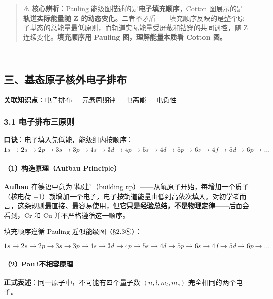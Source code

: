 \documentclass[a4paper,11pt]{ctexart}
\begin{document}
\begin{quote}
⚠️ \textbf{核心辨析}：Pauling 能级图描述的是\textbf{电子填充顺序}，Cotton 图展示的是\textbf{轨道实际能量随 Z 的动态变化}。二者不矛盾------填充顺序反映的是整个原子基态的总能量最低原则，而轨道实际能量受屏蔽和钻穿的共同调控，随 Z 连续变化。\textbf{填充顺序用 Pauling 图，理解能量本质看 Cotton 图。}
\end{quote}

------

\subsection{三、基态原子核外电子排布}\label{ux4e09ux57faux6001ux539fux5b50ux6838ux5916ux7535ux5b50ux6392ux5e03}

\textbf{关联知识点}：电子排布 · 元素周期律 · 电离能 · 电负性

\subsubsection{3.1 电子排布三原则}\label{ux7535ux5b50ux6392ux5e03ux4e09ux539fux5219}

\textbf{口诀}：电子填入先低能，能级组内按顺序：\(1s \to 2s \to 2p \to 3s \to 3p \to 4s \to 3d \to 4p \to 5s \to 4d \to 5p \to 6s \to 4f \to 5d \to 6p \to \dots\)

\paragraph{（1）构造原理（Aufbau Principle）}\label{ux6784ux9020ux539fux7406aufbau-principle}

\textbf{Aufbau} 在德语中意为''构建''（building up）------从氢原子开始，每增加一个质子（核电荷 +1）就增加一个电子，电子按轨道能量由低到高依次填入。对初学者而言，这条规则最直接、最容易使用，但\textbf{它只是经验总结，不是物理定律}------后面会看到，Cr 和 Cu 并不严格遵循这一顺序。

填充顺序遵循 Pauling 近似能级图（§2.3⑤）：

\[1s \to 2s \to 2p \to 3s \to 3p \to 4s \to 3d \to 4p \to 5s \to 4d \to 5p \to 6s \to 4f \to 5d \to 6p \to \dots\]

\paragraph{（2）Pauli不相容原理}\label{pauliux4e0dux76f8ux5bb9ux539fux7406}

\textbf{正式表述}：同一原子中，不可能有四个量子数 \((n,l,m_l,m_s)\) 完全相同的两个电子。
\end{document}
